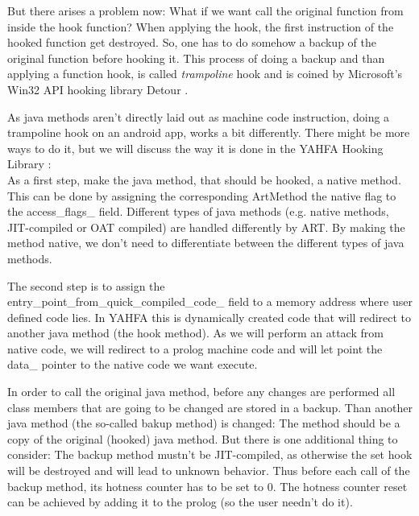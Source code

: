 But there arises a problem now: What if we want call the original function from inside the hook function? When applying the hook, the first instruction of the hooked function get destroyed. So, one has to do somehow a backup of the original function before hooking it. This process of doing a backup and than applying a function hook, is called \emph{trampoline} hook and is coined by Microsoft's Win32 API hooking library Detour \cite{detours-binary-interception-of-win32-functions}.

As java methods aren't directly laid out as machine code instruction, doing a trampoline hook on an android app, works a bit differently. There might be more ways to do it, but we will discuss the way it is done in the YAHFA Hooking Library \cite{YahfaGithub}:\\

As a first step, make the java method, that should be hooked, a native method. This can be done by assigning the corresponding ArtMethod the native flag to the access\_flags\_ field. Different types of java methods (e.g. native methods, JIT-compiled or OAT compiled) are handled differently by ART. By making the method native, we don't need to differentiate between the different types of java methods.

The second step is to assign the \\entry\_point\_from\_quick\_compiled\_code\_ field to a memory address where user defined code lies. In YAHFA this is dynamically created code that will redirect to another java method (the hook method). As we will perform an attack from native code, we will redirect to a prolog machine code and will let point the data\_ pointer to the native code we want execute.

In order to call the original java method, before any changes are performed all class members that are going to be changed are stored in a backup. Than another java method (the so-called bakup method) is changed: The method should be a copy of the original (hooked) java method. But there is one additional thing to consider: The backup method mustn't be JIT-compiled, as otherwise the set hook will be destroyed and will lead to unknown behavior. Thus before each call of the backup method, its hotness counter has to be set to 0. The hotness counter reset can be achieved by adding it to the prolog (so the user needn't do it).


